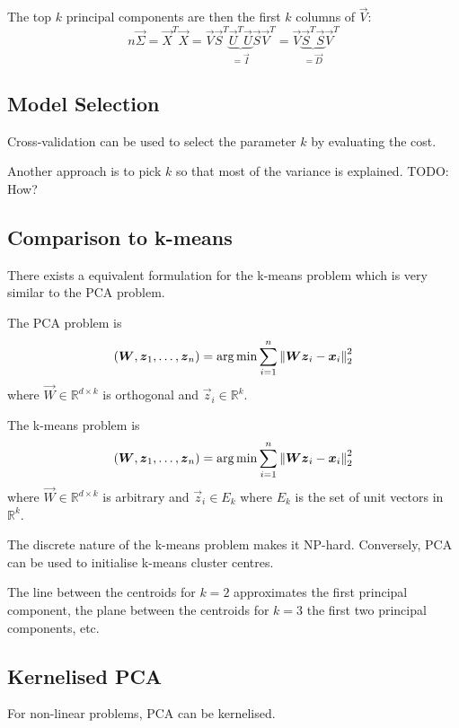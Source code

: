 The top $k$ principal components are then the first $k$
columns of $\vec{V}$:
\begin{equation*}
    n \vec{\Sigma}
    = \vec{X}^T \vec{X}
    = \vec{V} \vec{S}^T \underbrace{\vec{U}^T \vec{U}}_{=\vec{I}} \vec{S} \vec{V}^T
    = \vec{V} \underbrace{\vec{S}^T \vec{S}}_{= \vec{D}} \vec{V}^T
\end{equation*}


\subsection{Model Selection}
Cross-validation can be used to select the parameter $k$
by evaluating the cost.

Another approach is to pick $k$ so that most of the variance
is explained.
TODO: How?


\subsection{Comparison to k-means}
There exists a equivalent formulation for the k-means problem
which is very similar to the PCA problem.

The PCA problem is
\begin{equation*}
    (\boldsymbol{W}, \boldsymbol{z}_1, \dotsc, \boldsymbol{z}_n) = \arg\min{
        \sum_{i=1}^n{\left\lVert\boldsymbol{W} \boldsymbol{z}_i - \boldsymbol{x}_i\right\rVert_2^2}
    }
\end{equation*}
where $\vec{W} \in \mathbb{R}^{d \times k}$ is orthogonal and
$\vec{z}_i \in \mathbb{R}^k$.

The k-means problem is
\begin{equation*}
    (\boldsymbol{W}, \boldsymbol{z}_1, \dotsc, \boldsymbol{z}_n) = \arg\min{
        \sum_{i=1}^n{\left\lVert\boldsymbol{W} \boldsymbol{z}_i - \boldsymbol{x}_i\right\rVert_2^2}
    }
\end{equation*}
where $\vec{W} \in \mathbb{R}^{d \times k}$ is arbitrary and
$\vec{z}_i \in E_k$ where $E_k$ is the set of unit vectors
in $\mathbb{R}^k$.

The discrete nature of the k-means problem makes it NP-hard.
Conversely, PCA can be used to initialise k-means cluster centres.

The line between the centroids for $k=2$ approximates
the first principal component,
the plane between the centroids for $k=3$ the first
two principal components, etc.


\subsection{Kernelised PCA}
For non-linear problems, PCA can be kernelised.

